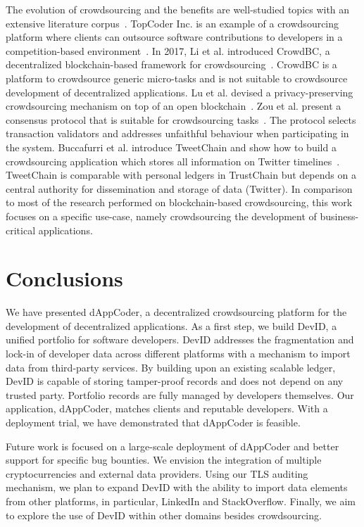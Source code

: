 The evolution of crowdsourcing and the benefits are well-studied topics with an extensive literature corpus~\cite{latoza2016crowdsourcing}.
TopCoder Inc. is an example of a crowdsourcing platform where clients can outsource software contributions to developers in a competition-based environment~\cite{lakhani2010topcoder}.
In 2017, Li et al. introduced CrowdBC, a decentralized blockchain-based framework for crowdsourcing~\cite{li2018crowdbc}.
CrowdBC is a platform to crowdsource generic micro-tasks and is not suitable to crowdsource development of decentralized applications.
Lu et al. devised a privacy-preserving crowdsourcing mechanism on top of an open blockchain~\cite{lu2018zebralancer}.
Zou et al. present a consensus protocol that is suitable for crowdsourcing tasks~\cite{zou2018proof}.
The protocol selects transaction validators and addresses unfaithful behaviour when participating in the system.
Buccafurri et al. introduce TweetChain and show how to build a crowdsourcing application which stores all information on Twitter timelines~\cite{buccafurri2017tweetchain}.
TweetChain is comparable with personal ledgers in TrustChain but depends on a central authority for dissemination and storage of data (Twitter).
In comparison to most of the research performed on blockchain-based crowdsourcing, this work focuses on a specific use-case, namely crowdsourcing the development of business-critical applications.

\section{Conclusions}
We have presented dAppCoder, a decentralized crowdsourcing platform for the development of decentralized applications.
As a first step, we build DevID, a unified portfolio for software developers.
DevID addresses the fragmentation and lock-in of developer data across different platforms with a mechanism to import data from third-party services.
By building upon an existing scalable ledger, DevID is capable of storing tamper-proof records and does not depend on any trusted party.
Portfolio records are fully managed by developers themselves.
Our application, dAppCoder, matches clients and reputable developers.
With a deployment trial, we have demonstrated that dAppCoder is feasible.

Future work is focused on a large-scale deployment of dAppCoder and better support for specific bug bounties.
We envision the integration of multiple cryptocurrencies and external data providers.
Using our TLS auditing mechanism, we plan to expand DevID with the ability to import data elements from other platforms, in particular, LinkedIn and StackOverflow.
Finally, we aim to explore the use of DevID within other domains besides crowdsourcing.